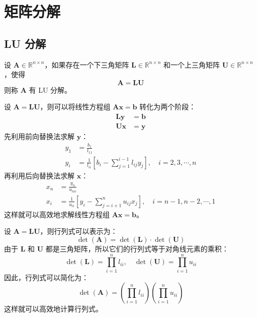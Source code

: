\section{矩阵分解}

\subsection{LU 分解}

\begin{definition}[LU 分解]
设 $\mathbf{A} \in \mathbb{R}^{n \times n}$，如果存在一个下三角矩阵 $\mathbf{L} \in \mathbb{R}^{n \times n}$ 和一个上三角矩阵 $\mathbf{U} \in \mathbb{R}^{n \times n}$，使得
\[
\mathbf{A} = \mathbf{L} \mathbf{U}
\]
则称 $\mathbf{A}$ 有 LU 分解。
\end{definition}

\begin{example}[使用 LU 分解求解线性方程组]
    设 $\mathbf{A} = \mathbf{L} \mathbf{U}$，则可以将线性方程组 $\mathbf{A}\mathbf{x} = \mathbf{b}$ 转化为两个阶段：
    \begin{align*}
        \mathbf{L}\mathbf{y} &= \mathbf{b}\\
        \mathbf{U}\mathbf{x} &= \mathbf{y}
    \end{align*}
    先利用前向替换法求解 $\mathbf{y}$：
    \begin{align*}
        y_1 &= \frac{b_1}{l_{11}} \\
        y_i &= \frac{1}{l_{ii}}\left[b_i - \sum_{j=1}^{i-1} l_{ij} y_j\right], \quad i=2,3,\cdots,n
    \end{align*}
    再利用后向替换法求解 $\mathbf{x}$：
    \begin{align*}
        x_n &= \frac{y_n}{u_{nn}} \\
        x_i &= \frac{1}{u_{ii}}\left[y_i - \sum_{j=i+1}^{n} u_{ij} x_j\right], \quad i=n-1,n-2,\cdots,1
    \end{align*}
    这样就可以高效地求解线性方程组 $\mathbf{A}\mathbf{x} = \mathbf{b}$。
    \label{ex:lu_decomposition_solve_linear_system}
\end{example}

\begin{example}[使用 LU 分解计算行列式]
    设 $\mathbf{A} = \mathbf{L} \mathbf{U}$，则行列式可以表示为：
    \[
        \det(\mathbf{A}) = \det(\mathbf{L}) \cdot \det(\mathbf{U})
    \]
    由于 $\mathbf{L}$ 和 $\mathbf{U}$ 都是三角矩阵，所以它们的行列式等于对角线元素的乘积：
    \[
        \det(\mathbf{L}) = \prod_{i=1}^{n} l_{ii}, \quad \det(\mathbf{U}) = \prod_{i=1}^{n} u_{ii}
    \]
    因此，行列式可以简化为：
    \[
        \det(\mathbf{A}) = \left( \prod_{i=1}^{n} l_{ii} \right) \left( \prod_{i=1}^{n} u_{ii} \right)
    \]
    这样就可以高效地计算行列式。
    \label{ex:lu_decomposition_determinant}
\end{example}


